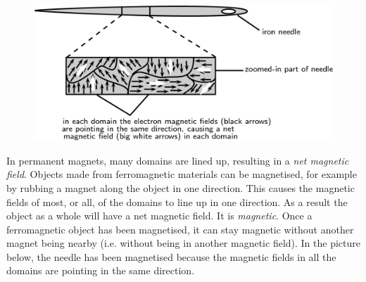     \setcounter{subfigure}{0}


	\begin{figure}[H] %
    \begin{center}
    \label{m37830*id128374!!!underscore!!!media}\label{m37830*id128374!!!underscore!!!printimage}\includegraphics[width=0.8\columnwidth]{col11305.imgs/m37830_PG10C7_002.png} %
        
      \vspace{2pt}
    \vspace{.1in}
    
    \end{center}

 \end{figure}   

    \addtocounter{footnote}{-0}
    
      \par 
      \label{m37830*id128380}In permanent magnets, many domains are lined up, resulting in a \textsl{net magnetic field}.
Objects made from ferromagnetic materials can be magnetised, for example by rubbing a magnet
along the object in one direction. This causes the magnetic fields of most, or all, of the domains to line up in one direction. As a result the object as a whole will have a net magnetic field. It is \textsl{magnetic}. Once a ferromagnetic object has been magnetised, it can stay magnetic without another magnet being nearby (i.e. without being in another magnetic field). In the picture below, the needle has been magnetised because the magnetic fields in all the domains are pointing in the same direction.\par 
      \label{m37830*id128400}
        
    \setcounter{subfigure}{0}


